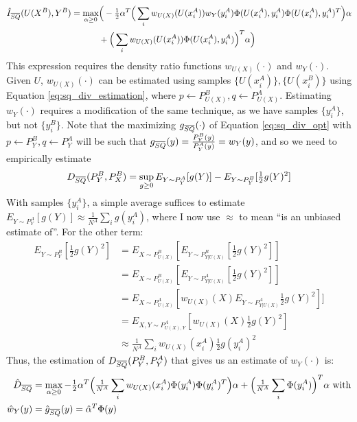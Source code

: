 \documentclass[8pt]{article}
\newcommand{\overbar}[1]{\mkern 1.0mu\overline{\mkern-1.0mu#1\mkern-1.0mu}\mkern 1.0mu}
\begin{document}
\begin{align}
\hat{I}_{\overbar{SQ}}(U(X^B),Y^B)=\max_{\alpha\geq 0} &\Bigr(-\tfrac{1}{2}\alpha^T\Big(\sum_i
w_{U(X)}(U(x_i^A))w_Y(y_i^A)\Phi(U(x_i^A),y_i^A)
\Phi(U(x_i^A),y_i^A)^T\Big)\alpha \\
&+ \Big(\sum_i w_{U(X)}(U(x_i^A))
\Phi(U(x_i^A),y_i^A)\Big)^T\alpha \Bigr)
\end{align}
This expression requires the density ratio functions $w_{U(X)}(\cdot)$
and $w_Y(\cdot)$. Given $U$, $w_{U(X)}(\cdot)$ can be estimated using
samples $\{U(x_i^A)\},\{U(x_i^B)\}$ using Equation
\ref{eq:sq_div_estimation}, where $p\leftarrow P^B_{U(X)}, q\leftarrow
P^A_{U(X)}$.
Estimating $w_Y(\cdot)$ requires a modification of the same technique,
as we have samples $\{y_i^A\}$, but not $\{y_i^B\}$.  Note that the
maximizing $g_{\overbar{SQ}}(\cdot)$ of Equation \ref{eq:sq_div_opt}
with $p\leftarrow P^B_Y,q\leftarrow P^A_Y$ will be such that
$g_{\overbar{SQ}}(y)=\tfrac{P^B_Y(y)}{P^A_Y(y)}=w_Y(y)$, and so we
need to empirically estimate 
\begin{align}
D_{\overbar{SQ}}(P^B_Y,P^B_X) = \sup_{g \geq 0}E_{Y\sim P^A_Y}[g(Y)] -
E_{Y\sim P^B_Y}[\tfrac{1}{2}g(Y)^2]
\end{align}
With samples $\{y_i^A\}$, a simple average suffices to estimate
$E_{Y\sim P^A_Y}[g(Y)]\approx \tfrac{1}{N^A}\sum_ig(y_i^A)$, where I
now use $\approx$ to mean ``is an unbiased estimate of''.  For the
other term:
\begin{align}
E_{Y\sim P^B_Y}[\tfrac{1}{2}g(Y)^2] &= E_{X\sim P^B_{U(X)}}[E_{Y \sim
  P^B_{Y|U(X)}}[\tfrac{1}{2}g(Y)^2]]\\
&= E_{X\sim P^B_{U(X)}}[E_{Y \sim P^A_{Y|U(X)}}[\tfrac{1}{2}g(Y)^2]]\\
&= E_{X\sim P^A_{U(X)}}[w_{U(X)}(X)E_{Y \sim
  P^A_{Y|U(X)}}\tfrac{1}{2}g(Y)^2]]\\
&= E_{X,Y\sim P^A_{U(X),Y}}[w_{U(X)}(X)\tfrac{1}{2}g(Y)^2]\\
&\approx \tfrac{1}{N^A}\sum_i w_{U(X)}(x_i^A)\tfrac{1}{2}g(y_i^A)^2
\end{align}
Thus, the estimation of $D_{\overbar{SQ}}(P_Y^B,P_Y^A)$ that gives us
an estimate of $w_Y(\cdot)$ is:
\begin{align}
\hat{D}_{\overbar{SQ}}&=\max_{\alpha \geq 0}
-\tfrac{1}{2}\alpha^T\Big(\tfrac{1}{N^A}\sum_i w_{U(X)}(x_i^A)\Phi(y_i^A)\Phi(y_i^A)^T\Big)\alpha
+\Big(\tfrac{1}{N^A}\sum_i \Phi(y_i^A)\Big)^T\alpha\ \text{with}\\
\hat{w}_Y(y) &= \hat{g}_{\overbar{SQ}}(y) = \hat{\alpha}^T\Phi(y) \label{eq:w_y}
\end{align}
\end{document}
